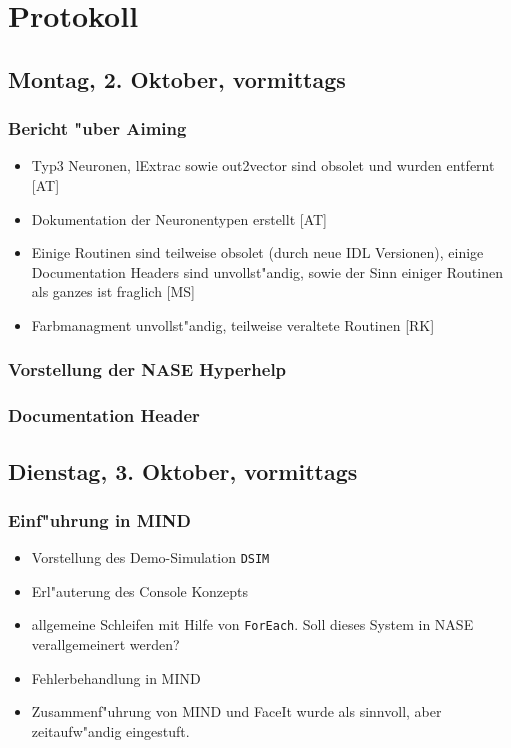 \documentclass[12pt]{article}
\begin{document}
\section{Protokoll}

\subsection{Montag, 2. Oktober, vormittags}

\subsubsection{Bericht "uber Aiming}
\begin{itemize}
\item Typ3 Neuronen, lExtrac sowie out2vector sind obsolet und wurden entfernt [AT]
\item Dokumentation der Neuronentypen erstellt [AT]
\item Einige Routinen sind teilweise obsolet (durch neue IDL Versionen), einige Documentation Headers sind unvollst"andig, sowie der Sinn einiger Routinen als ganzes ist fraglich [MS]
\item Farbmanagment unvollst"andig, teilweise veraltete Routinen [RK]
\end{itemize}

\subsubsection{Vorstellung der NASE Hyperhelp}

\subsubsection{Documentation Header}




\subsection{Dienstag, 3. Oktober, vormittags}

\subsubsection{Einf"uhrung in MIND}
\begin{itemize}
\item Vorstellung des Demo-Simulation \texttt{DSIM}
\item Erl"auterung des Console Konzepts
\item allgemeine Schleifen mit Hilfe von \texttt{ForEach}. Soll dieses System in NASE verallgemeinert werden?
\item Fehlerbehandlung in MIND
\item Zusammenf"uhrung  von MIND und FaceIt wurde als sinnvoll, aber zeitaufw"andig eingestuft.
\end{itemize}
\end{document}
